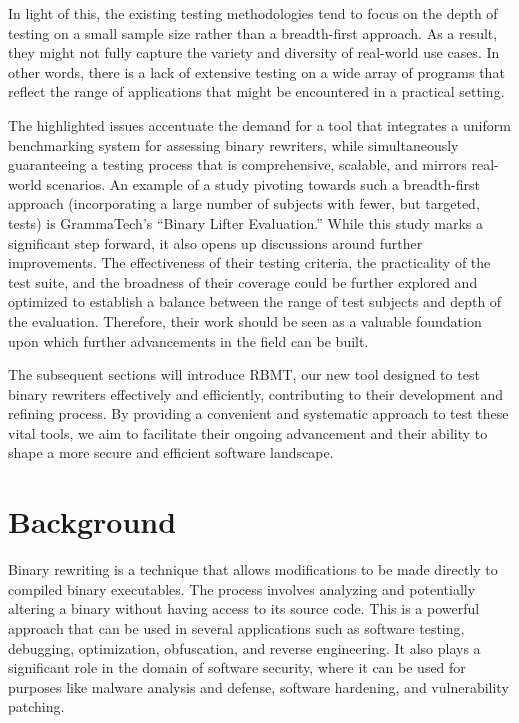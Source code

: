 \documentclass[a4paper,11pt,oneside]{report}
\begin{document}
In light of this, the existing testing methodologies tend to focus on the depth of
testing on a small sample size rather than a breadth-first approach. As a result, they might
not fully capture the variety and diversity of real-world use cases. In other words, there is a
lack of extensive testing on a wide array of programs that reflect the range of applications
that might be encountered in a practical setting.

The highlighted issues accentuate the demand for a tool that integrates a uniform
benchmarking system for assessing binary rewriters, while simultaneously guaranteeing a
testing process that is comprehensive, scalable, and mirrors real-world scenarios. An
example of a study pivoting towards such a breadth-first approach (incorporating a large
number of subjects with fewer, but targeted, tests) is GrammaTech’s “Binary Lifter
Evaluation.” While this study marks a significant step forward, it also opens up discussions
around further improvements. The effectiveness of their testing criteria, the practicality of
the test suite, and the broadness of their coverage could be further explored and optimized
to establish a balance between the range of test subjects and depth of the evaluation.
Therefore, their work should be seen as a valuable foundation upon which further
advancements in the field can be built.

The subsequent sections will introduce RBMT, our new tool designed to test binary
rewriters effectively and efficiently, contributing to their development and refining process.
By providing a convenient and systematic approach to test these vital tools, we aim to
facilitate their ongoing advancement and their ability to shape a more secure and efficient
software landscape.

\chapter{Background}
\setlength{\parindent}{4em}

\indent{}Binary rewriting is a technique that allows modifications to be made directly to
compiled binary executables. The process involves analyzing and potentially altering a
binary without having access to its source code. This is a powerful approach that can be
used in several applications such as software testing, debugging, optimization, obfuscation,
and reverse engineering. It also plays a significant role in the domain of software security,
where it can be used for purposes like malware analysis and defense, software hardening,
and vulnerability patching.
\end{document}
